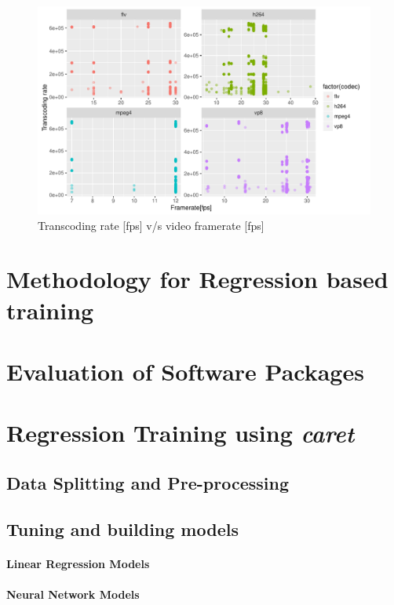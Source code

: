 \documentclass[letterpaper,12pt,titlepage,oneside,final]{report}
\begin{document}
        \begin{figure}[!h]
            \centering
            \includegraphics[width=\textwidth]{framerate_vs_trate}
            \caption{Transcoding rate [fps] v/s video framerate [fps]}
            \label{framerate_vs_trate}
        \end{figure}
    \section {Methodology for Regression based training}
        \section {Evaluation of Software Packages}

        \section {Regression Training using \textit{caret}}

            \subsection{Data Splitting and Pre-processing}
            \subsection{Tuning and building models}
                \paragraph {Linear Regression Models}
                \paragraph {Neural Network Models}
\end{document}
